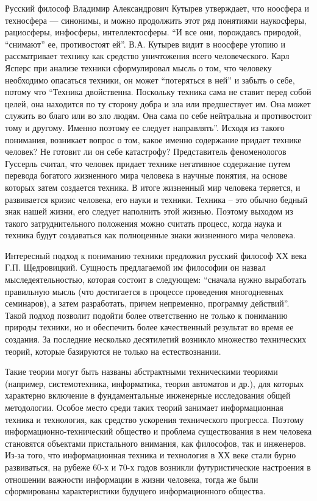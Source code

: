 Русский философ Владимир Александрович Кутырев утверждает, что ноосфера и техносфера — синонимы, и можно продолжить этот ряд понятиями наукосферы, рациосферы, инфосферы, интеллектосферы. ``И все они, порождаясь природой, ``снимают'' ее, противостоят ей''. В.А. Кутырев видит в ноосфере утопию и рассматривает технику как средство уничтожения всего человеческого. Карл Ясперс при анализе техники сформулировал мысль о том, что человеку необходимо опасаться техники, он может ``потеряться в ней'' и забыть о себе, потому что ``Техника двойственна. Поскольку техника сама не ставит перед собой целей, она находится по ту сторону добра и зла или предшествует им. Она может служить во благо или во зло людям. Она сама по себе нейтральна и противостоит тому и другому. Именно поэтому ее следует направлять''. Исходя из такого понимания, возникает вопрос о том, какое именно содержание придает технике человек? Не готовит ли он себе катастрофу?  Представитель феноменологов Гуссерль считал, что человек придает технике негативное содержание путем перевода богатого жизненного мира человека в научные понятия, на основе которых затем создается техника. В итоге жизненный мир человека теряется, и развивается кризис человека, его науки и техники. Техника -- это обычно бедный знак нашей жизни, его следует наполнить этой жизнью. Поэтому выходом из такого затруднительного положения можно считать процесс, когда наука и техника будут создаваться как полноценные знаки жизненного мира человека.

Интересный подход к пониманию техники предложил русский философ ХХ века Г.П. Щедровицкий. Сущность предлагаемой им философии он назвал мыследеятельностью, которая состоит в следующем: ``сначала нужно выработать правильную мысль (что достигается в процессе проведения многодневных семинаров), а затем разработать, причем непременно, программу действий''. Такой подход позволит подойти более ответственно не только к пониманию природы техники, но и обеспечить более качественный результат во время ее создания.  За последние несколько десятилетий возникло множество технических теорий, которые базируются не только на естествознании.

Такие теории могут быть названы абстрактными техническими теориями (например, системотехника, информатика, теория автоматов и др.), для которых характерно включение в фундаментальные инженерные исследования общей методологии. Особое место среди таких теорий занимает информационная техника и технология, как средство ускорения технического прогресса. Поэтому информационно-технический общество и проблема существования в нем человека становятся объектами пристального внимания, как философов, так и инженеров. Из-за того, что информационная техника и технология в ХХ веке стали бурно развиваться, на рубеже 60-х и 70-х годов возникли футуристические настроения в отношении важности информации в жизни человека, тогда же были сформированы характеристики будущего информационного общества.

